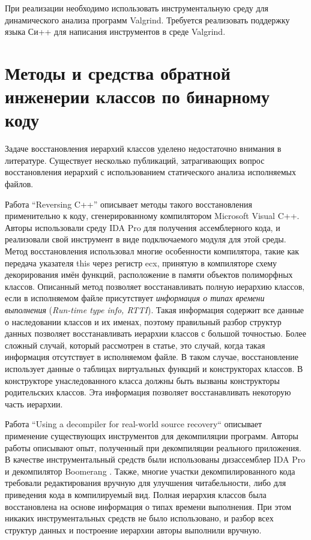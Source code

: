 \documentclass[a4paper,12pt,russian]{article}
\newcommand{\code}[1]{\textsf{#1}}
\begin{document}
При реализации необходимо использовать инструментальную среду для динамического анализа программ \code{Valgrind}.
Требуется реализовать поддержку языка Си++ для написания инструментов в среде \code{Valgrind}.

\newpage
\section{Методы и средства обратной инженерии классов по бинарному коду}
\label{reverse_eng_overview}
Задаче восстановления иерархий классов уделено недостаточно внимания в литературе.
Существует несколько публикаций, затрагивающих вопрос восстановления иерархий с использованием статического анализа исполняемых файлов.

Работа ``Reversing C++'' \cite{reversing_cpp} описывает методы такого восстановления применительно к коду, сгенерированному компилятором Microsoft Visual C++.
Авторы использовали среду IDA Pro \cite{ida_pro} для получения ассемблерного кода, и реализовали свой инструмент в виде подключаемого модуля для этой среды.
Метод восстановления использовал многие особенности компилятора, такие как передача указателя \code{this} через регистр \code{ecx}, принятую в компиляторе схему декорирования имён функций, расположение в памяти объектов полиморфных классов.
Описанный метод позволяет восстанавливать полную иерархию классов, если в исполняемом файле присутствует \emph{информация о типах времени выполнения} (\emph{Run-time type info, RTTI}).
Такая информация содержит все данные о наследовании классов и их именах, поэтому правильный разбор структур данных позволяет восстанавливать иерархии классов с большой точностью.
Более сложный случай, который рассмотрен в статье, это случай, когда такая информация отсутствует в исполняемом файле.
В таком случае, восстановление использует данные о таблицах виртуальных функций и конструкторах классов.
В конструкторе унаследованного класса должны быть вызваны конструкторы родительских классов.
Эта информация позволяет восстанавливать некоторую часть иерархии.


Работа ``Using a decompiler for real-world source recovery`` \cite{real_decomp} описывает применение существующих инструментов для декомпиляции программ.
Авторы работы описывают опыт, полученный при декомпиляции реального приложения.
В качестве инструментальный средств были использованы дизассемблер IDA Pro \cite{ida_pro} и декомпилятор Boomerang \cite{boomerang}.
Также, многие участки декомпилированного кода требовали редактирования вручную для улучшения читабельности, либо для приведения кода в компилируемый вид.
Полная иерархия классов была восстановлена на основе информация о типах времени выполнения.
При этом никаких инструментальных средств не было использовано, и разбор всех структур данных и построение иерархии авторы выполнили вручную.
\end{document}
